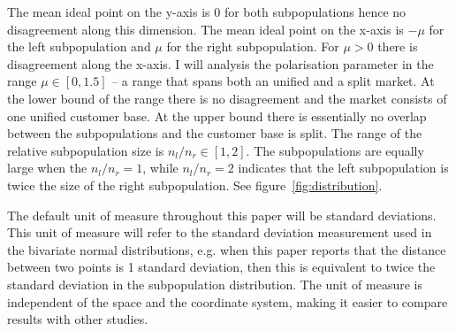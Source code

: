 \documentclass[preprint, 12pt]{elsarticle}
\begin{document}
The mean ideal point on the y-axis is 0 for both subpopulations hence no disagreement along this dimension. The mean ideal point on the x-axis is $-\mu$ for the left subpopulation and $\mu$ for the right subpopulation. For $\mu > 0$ there is disagreement along the x-axis. I will analysis the polarisation parameter in the range $\mu \in [0, 1.5]$ -- a range that spans both an unified and a split market. At the lower bound of the range there is no disagreement and the market consists of one unified customer base. At the upper bound there is essentially no overlap between the subpopulations and the customer base is split. The range of the relative subpopulation size is $n_l/n_r \in [1, 2]$. The subpopulations are equally large when the $n_l/n_r = 1$, while $n_l/n_r = 2$ indicates that the left subpopulation is twice the size of the right subpopulation. See figure~\ref{fig:distribution}.

The default unit of measure throughout this paper will be standard deviations. This unit of measure will refer to the standard deviation measurement used in the bivariate normal distributions, e.g. when this paper reports that the distance between two points is 1 standard deviation, then this is equivalent to twice the standard deviation in the subpopulation distribution. The unit of measure is independent of the space and the coordinate system, making it easier to compare results with other studies.
\end{document}
